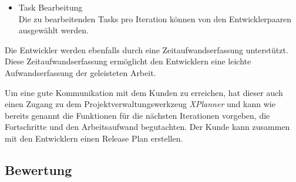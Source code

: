 \begin{description}
\begin{itemize}
\item Task Bearbeitung\\
Die zu bearbeitenden Tasks pro Iteration können von den Entwicklerpaaren ausgewählt werden. 
\end{itemize}

Die Entwickler werden ebenfalls durch eine Zeitaufwandserfassung unterstützt. Diese Zeitaufwandserfassung ermöglicht den Entwicklern eine leichte Aufwandserfassung der geleisteten Arbeit.

Um eine gute Kommunikation mit dem Kunden zu erreichen, hat dieser auch einen Zugang zu dem Projektverwaltungswerkzeug \emph{XPlanner} und kann wie bereits genannt die Funktionen für die nächsten Iterationen vorgeben, die Fortschritte und den Arbeitsaufwand begutachten. Der Kunde kann zusammen mit den Entwicklern einen Release Plan erstellen. \cite{bib:xplanner}

\end{description}

\subsection{Bewertung}

